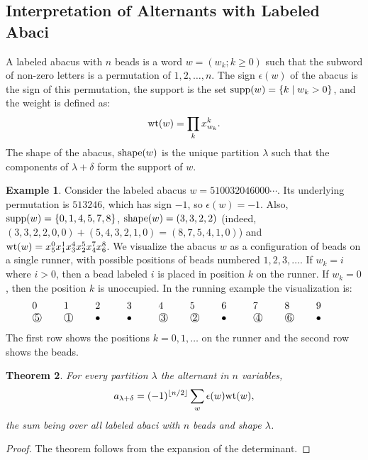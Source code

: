 \documentclass[11pt]{amsproc}
\newtheorem{theorem}{Theorem}[subsection]
\theoremstyle{definition}
\theoremstyle{example}
\newtheorem{example}[theorem]{Example}
\newcommand{\supp}{\textup{supp}}
\newcommand{\wt}{\textup{wt}}
\newcommand{\shape}{\textup{shape}}
\renewcommand{\circled}[1]{\raisebox{.5pt}{\textcircled{\raisebox{-.9pt} {#1}}}}
\begin{document}
\subsection{Interpretation of Alternants with Labeled Abaci}
\label{sec:abaci}
A labeled abacus with $n$ beads is a word $w=(w_k; k\geq 0)$ such that the subword of non-zero letters is a permutation of $1,2,\dotsc,n$.
The sign $\epsilon(w)$ of the abacus is the sign of this permutation, the support is the set $\supp(w)=\{k\mid w_k>0\}$, and the weight is defined as:
\begin{displaymath}
  \wt(w) = \prod_k x_{w_k}^k.
\end{displaymath}
The shape of the abacus, $\shape(w)$ is the unique partition $\lambda$ such that the components of $\lambda+\delta$ form the support of $w$.
\begin{example}
  Consider the labeled abacus $w=510032046000\dotsb$.
  Its underlying permutation is $513246$, which has sign $-1$, so $\epsilon(w)=-1$.
  Also, $\supp(w)=\{0,1,4,5,7,8\}$, $\shape(w)=(3,3,2,2)$ (indeed, $(3,3,2,2,0,0)+(5,4,3,2,1,0)=(8,7,5,4,1,0)$) and $\wt(w)=x_5^0x_1^1x_3^4x_2^5x_4^7x_6^8$.
  We visualize the abacus $w$ as a configuration of beads on a single runner, with possible positions of beads numbered $1, 2, 3, \dotsc$.
  If $w_k=i$ where $i>0$, then a bead labeled $i$ is placed in position $k$ on the runner.
  If $w_k=0$, then the position $k$ is unoccupied.
  In the running example the visualization is:
  \begin{displaymath}
    \begin{tabular}{*{10}{p{0.7cm}}}
      0 & 1 & 2 & 3 & 4 & 5 & 6 & 7 & 8 & 9\\
      \circled{5} & \circled{1} & $\bullet$ & $\bullet$ & \circled{3} & \circled{2} & $\bullet$ & \circled{4} & \circled{6} & $\bullet$
    \end{tabular}
  \end{displaymath}
  The first row shows the positions $k=0,1,\dotsc$ on the runner and the second row shows the beads.
\end{example}
\begin{theorem}
  \label{theorem:abacus-alt}
  For every partition $\lambda$ the alternant in $n$  variables,
  \begin{displaymath}
    a_{\lambda+\delta} = (-1)^{\lfloor n/2\rfloor} \sum_w \epsilon(w)\wt(w),
  \end{displaymath}
  the sum being over all labeled abaci with $n$ beads and shape $\lambda$.
\end{theorem}
\begin{proof}
  The theorem follows from the expansion of the determinant.
\end{proof}
\end{document}
